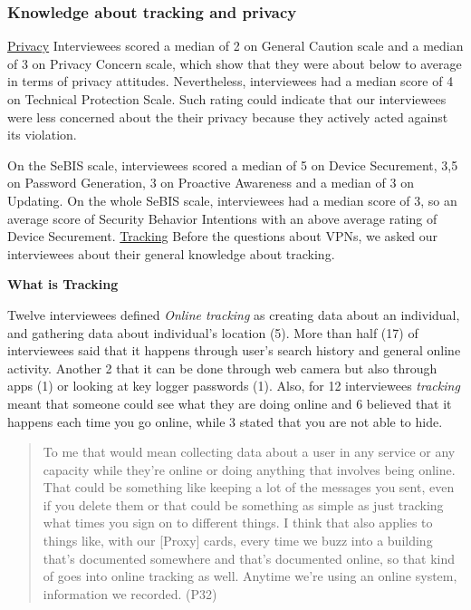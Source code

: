 \subsubsection{Knowledge about tracking and privacy}
\label{sec:methods-tracking}

\underline{Privacy} Interviewees scored a median of 2 on General Caution scale
and a median of 3 on Privacy Concern scale, which show that they were about
below to average in terms of privacy attitudes. Nevertheless, interviewees had
a median score of 4 on Technical Protection Scale. Such rating could indicate
that our interviewees were less concerned  about the their privacy because
they actively acted against its violation. 

On the SeBIS scale, interviewees scored a median of 5 on Device Securement,
3,5 on Password Generation, 3 on Proactive Awareness and a median of 3 on
Updating. On the whole SeBIS scale, interviewees had a median score of 3, so
an average score of Security Behavior Intentions with an above average rating
of Device Securement.  \underline{Tracking} Before the questions about VPNs,
we asked our interviewees about their general knowledge about tracking. 

\textbf{What is Tracking}

Twelve interviewees defined \textit{Online tracking} as creating data about an
individual, and gathering data about individual's location (5). More than half
(17) of interviewees said that it happens through user's search history and
general online activity. Another 2 that it can be done through web camera but
also through apps (1) or looking at key logger passwords (1). Also, for 12
interviewees  \textit{tracking} meant that someone could see what they are
doing online and 6 believed that it happens each time you go online, while 3
stated that you are not able to hide.

\begin{quote}To me that would mean collecting data about a user in any service
or any capacity while they're online or doing anything that involves being
online. That could be something like keeping a lot of the messages you sent,
even if you delete them or that could be something as simple as just tracking
what times you sign on to different things. I think that also applies to
things like, with our [Proxy] cards, every time we buzz into a building that's
documented somewhere and that's documented online, so that kind of goes into
online tracking as well. Anytime we're using an online system, information we
recorded. (P32)\end{quote}



